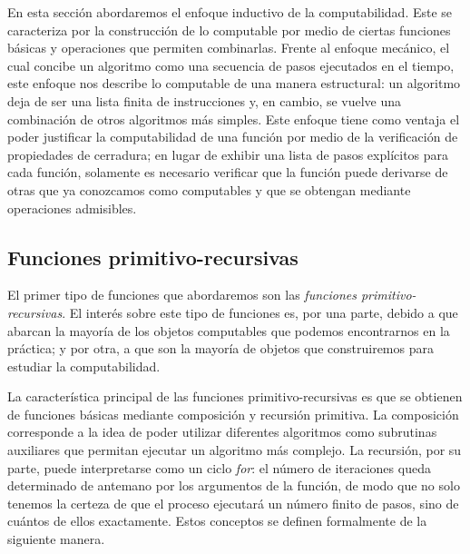 En esta sección abordaremos el enfoque inductivo de la computabilidad. Este se caracteriza por la construcción de lo computable por medio de ciertas funciones básicas y operaciones que permiten combinarlas. Frente al enfoque mecánico, el cual concibe un algoritmo como una secuencia de pasos ejecutados en el tiempo, este enfoque nos describe lo computable de una manera estructural: un algoritmo deja de ser una lista finita de instrucciones y, en cambio, se vuelve una combinación de otros algoritmos más simples. Este enfoque tiene como ventaja el poder justificar la computabilidad de una función por medio de la verificación de propiedades de cerradura; en lugar de exhibir una lista de pasos explícitos para cada función, solamente es necesario verificar que la función puede derivarse de otras que ya conozcamos como computables y que se obtengan mediante operaciones admisibles.

\subsection{Funciones primitivo-recursivas}

El primer tipo de funciones que abordaremos son las \emph{funciones primitivo-recursivas}. El interés sobre este tipo de funciones es, por una parte, debido a que abarcan la mayoría de los objetos computables que podemos encontrarnos en la práctica; y por otra, a que son la mayoría de objetos que construiremos para estudiar la computabilidad.

La característica principal de las funciones primitivo-recursivas es que se obtienen de funciones básicas mediante composición y recursión primitiva. La composición corresponde a la idea de poder utilizar diferentes algoritmos como subrutinas auxiliares que permitan ejecutar un algoritmo más complejo. La recursión, por su parte, puede interpretarse como un ciclo \emph{for}: el número de iteraciones queda determinado de antemano por los argumentos de la función, de modo que no solo tenemos la certeza de que el proceso ejecutará un número finito de pasos, sino de cuántos de ellos exactamente. Estos conceptos se definen formalmente de la siguiente manera.

